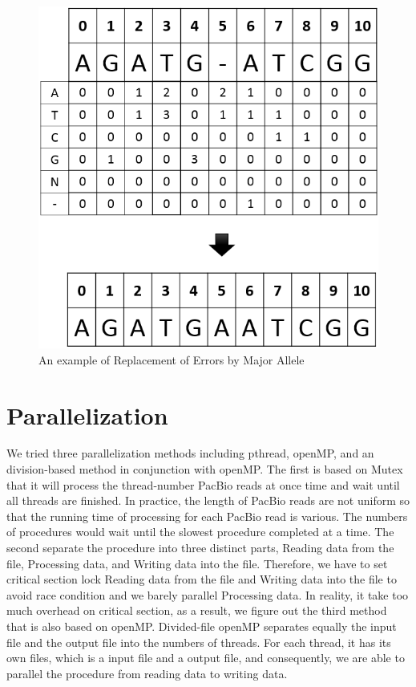 \begin{figure} [h]
\centering
\includegraphics[scale=0.5]{Figures/chapter3/replacmentOfcorrection.png}
\caption{An example of Replacement of Errors by Major Allele}
\label{replacment}
\end{figure}

\newpage

\section{Parallelization}

We tried three parallelization methods including pthread, openMP, and an division-based method in conjunction with openMP. The first is based on Mutex that it will process the thread-number PacBio reads at once time and wait until all threads are finished. In practice, the length of PacBio reads are not uniform so that the running time of processing for each PacBio read is various. The numbers of procedures would wait until the slowest procedure completed at a time. The second separate the procedure into three distinct parts, Reading data from the file, Processing data, and Writing data into the file. Therefore, we have to set critical section lock Reading data from the file and Writing data into the file to avoid race condition and we barely parallel Processing data. In reality, it take too much overhead on critical section, as a result, we figure out the third method that is also based on openMP. Divided-file openMP separates equally the input file and the output file into the numbers of threads. For each thread, it has its own files, which is a input file and a output file, and consequently, we are able to parallel the procedure from reading data to writing data.

